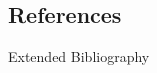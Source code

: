 \documentclass[beamer,handout,10pt]{standalone}
\begin{document}


\subsection{References}

\begin{frame}[t,allowframebreaks]{Extended Bibliography}
	
	
\end{frame}




\end{document}
